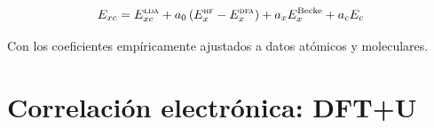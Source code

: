 \begin{equation}
    E_{xc}=E_{xc}^{\textsc{lda}}+a_{0}\left(E_{x}^{\textsc{hf}}-E_{x}^{\textsc{dfa}}\right)+a_{x}E_{x}^{\text{Becke}}+a_{c}E_{c}
\end{equation}

Con los coeficientes empíricamente ajustados a datos atómicos y moleculares.



\section{Correlación electrónica: DFT+U}

